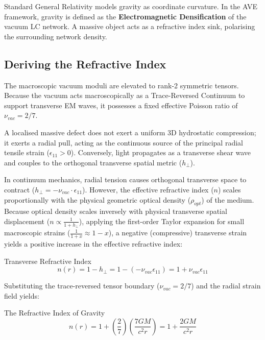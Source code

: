 Standard General Relativity models gravity as coordinate curvature. In the AVE framework, gravity is defined as the \textbf{Electromagnetic Densification} of the vacuum LC network. A massive object acts as a refractive index sink, polarising the surrounding network density.

\subsection{Deriving the Refractive Index}

The macroscopic vacuum moduli are elevated to rank-2 symmetric tensors. Because the vacuum acts macroscopically as a Trace-Reversed Continuum to support transverse EM waves, it possesses a fixed effective Poisson ratio of $\nu_{vac}=2/7$. 

A localised massive defect does not exert a uniform 3D hydrostatic compression; it exerts a radial pull, acting as the continuous source of the principal radial tensile strain ($\epsilon_{11} > 0$). Conversely, light propagates as a transverse shear wave and couples to the orthogonal transverse spatial metric ($h_{\perp}$). 

In continuum mechanics, radial tension causes orthogonal transverse space to contract ($h_{\perp} = -\nu_{vac} \cdot \epsilon_{11}$). However, the effective refractive index ($n$) scales proportionally with the physical geometric optical density ($\rho_{opt}$) of the medium. Because optical density scales inversely with physical transverse spatial displacement ($n \propto \frac{1}{1 + h_{\perp}}$), applying the first-order Taylor expansion for small macroscopic strains ($\frac{1}{1+x} \approx 1-x$), a negative (compressive) transverse strain yields a positive increase in the effective refractive index:

\begin{resultbox}{Transverse Refractive Index}
\begin{equation}
n(r) = 1 - h_{\perp} = 1 - (-\nu_{vac}\epsilon_{11}) = 1 + \nu_{vac}\epsilon_{11}
\end{equation}
\end{resultbox}

Substituting the trace-reversed tensor boundary ($\nu_{vac} = 2/7$) and the radial strain field yields:

\begin{resultbox}{The Refractive Index of Gravity}
\begin{equation}
n(r) = 1 + \left(\frac{2}{7}\right)\left(\frac{7GM}{c^2r}\right) = 1 + \frac{2GM}{c^2r}
\end{equation}
\end{resultbox}

